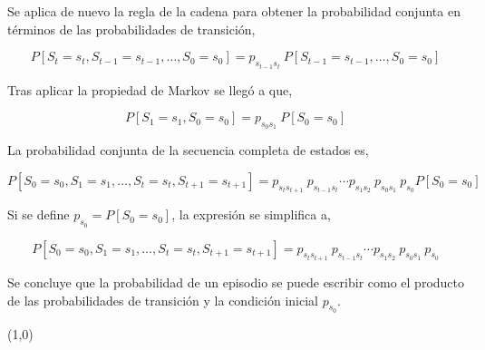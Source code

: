 Se aplica de nuevo la regla de la cadena para obtener la probabilidad conjunta en términos de las probabilidades de transición,

\[
    P[S_t = s_t, S_{t-1} = s_{t-1}, \dots, S_0 = s_0] = p_{s_{t-1} s_{t}} \ P[S_{t-1} = s_{t-1}, \ldots, S_0 = s_0]
\]

Tras aplicar la propiedad de Markov se llegó a que,

\[
    P[S_1 = s_1, S_0 = s_0] = p_{s_0 s_1} \ P[S_0 = s_0]
\]

La probabilidad conjunta de la secuencia completa de estados es,

\[
    P[S_0 = s_0, S_1 = s_1, \ldots, S_t = s_t, S_{t+1} = s_{t+1}] = p_{s_t s_{t+1}} \ p_{s_{t-1} s_t} \cdots p_{s_1 s_2} \ p_{s_0 s_1} \ p_{s_0} P[S_0 = s_0]
\]

Si se define \( p_{s_0} = P[S_0 = s_0] \), la expresión se simplifica a,

\[
    P[S_0 = s_0, S_1 = s_1, \ldots, S_t = s_t, S_{t+1} = s_{t+1}] = p_{s_t s_{t+1}} \ p_{s_{t-1} s_t} \cdots p_{s_1 s_2} \ p_{s_0 s_1} \ p_{s_0}
\]

Se concluye que la probabilidad de un episodio se puede escribir como el producto de las probabilidades de transición y la condición inicial $p_{s_0}$.

\line(1,0){\textwidth}

